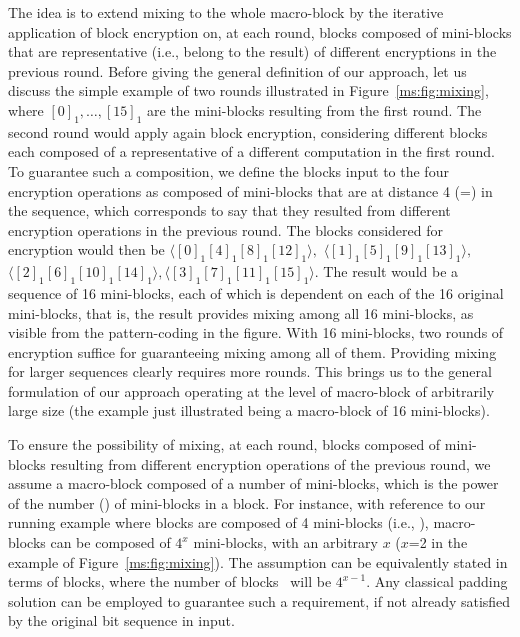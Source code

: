 The idea is to extend mixing to the whole macro-block by the iterative application of block encryption on, at each round, blocks composed of mini-blocks that are representative (i.e., belong to the result) of different encryptions in the previous round. Before giving the general definition of our approach, let us discuss the simple example of two rounds illustrated in Figure~\ref{ms:fig:mixing}, where $[0]_1, \ldots, [15]_1$ are the mini-blocks resulting from the first round. The second round would apply again block encryption, considering different blocks each composed of a representative of a different computation in the first round. To guarantee such a composition, we define the blocks input to the four encryption operations as composed of mini-blocks that are at distance 4 (=\mnumb) in the sequence, which corresponds to say that they resulted from different encryption operations in the previous round. The blocks considered for encryption would then be $\langle [0]_1[4]_1[8]_1[12]_1\rangle,$ $\langle [1]_1[5]_1[9]_1[13]_1\rangle,$$ \langle [2]_1[6]_1[10]_1[14]_1\rangle, $$\langle [3]_1[7]_1[11]_1[15]_1 \rangle.$ The result would be a sequence of 16 mini-blocks, each of which is dependent on each of the 16 original mini-blocks, that is, the result provides mixing among all 16 mini-blocks, as visible from the pattern-coding in the figure. With 16 mini-blocks, two rounds of encryption suffice for guaranteeing mixing among all of them. Providing mixing for larger sequences clearly requires more rounds. This brings us to the general formulation of our approach operating at the level of macro-block of arbitrarily large size (the example just illustrated being a macro-block of 16 mini-blocks).

To ensure the possibility of mixing, at each round, blocks composed of mini-blocks resulting from different encryption operations of the previous round, we assume a macro-block composed of a number of mini-blocks, which is the power of the number (\mnumb) of mini-blocks in a block. For instance, with reference to our running example where blocks are composed of 4 mini-blocks (i.e., ), macro-blocks can be composed of $4^x$ mini-blocks, with an arbitrary $x$ ($x$=2 in the example of Figure~\ref{ms:fig:mixing}). The assumption can be equivalently stated in terms of blocks, where the number of blocks \bnum\ will be $4^{x-1}$. Any classical padding solution can be employed to guarantee such a requirement, if not already satisfied by the original bit sequence in input.

